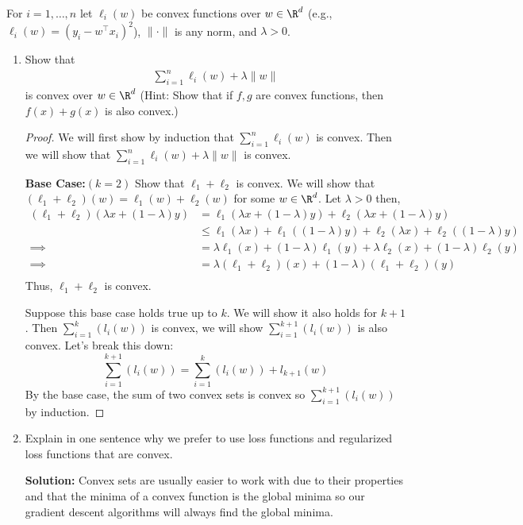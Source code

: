 \documentclass[shortlabels]{article}
\begin{document}
\begin{bprob}
    For $i=1,\dots,n$ let $\ell_i(w)$ be convex functions over $w \in \R^d$ (e.g., $\ell_i(w) = (y_i - w^\top x_i)^2$), $\| \cdot \|$ is any norm, and $\lambda >0$. 
    \begin{enumerate}
        \item {} Show that 
        \begin{align*}
            \sum_{i=1}^n \ell_i(w) + \lambda \| w \|
        \end{align*}
        is convex over $w\in \R^d$ (Hint: Show that if $f,g$ are convex functions, then $f(x) + g(x)$ is also convex.) 
        
        \begin{proof}
            We will first show by induction that $\sum_{i=1}^n \ell_i(w)$ is convex. Then we will show that $\sum_{i=1}^n \ell_i(w) + \lambda \| w \| $ is convex.

            \textbf{Base Case:}$(k=2)$ Show that $\ell_1 + \ell_2$ is convex. 
            We will show that $(\ell_1 + \ell_2)(w) = \ell_1(w) + \ell_2(w)$ for some $w \in \R^d$. Let $\lambda >0$ then,
            \begin{align*}
                (\ell_1 + \ell_2)(\lambda x + (1-\lambda)y) &= \ell_1(\lambda x + (1-\lambda)y) + \ell_2(\lambda x + (1-\lambda)y) \\
                &\leq \ell_1(\lambda x) + \ell_1((1-\lambda)y) + \ell_2(\lambda x) + \ell_2((1-\lambda)y) \\
                \implies &= \lambda \ell_1( x) + (1-\lambda) \ell_1(y) + \lambda  \ell_2(x) + (1-\lambda) \ell_2(y) \\
                \implies &=  \lambda (\ell_1 + \ell_2) (x) + (1-\lambda) (\ell_1 + \ell_2) (y) \\
            \end{align*}
            Thus, $\ell_1 + \ell_2$ is convex.

            Suppose this base case holds true up to $k$. We will show it also holds for $k+1$.
            Then $\sum_{i=1}^k (l_i(w))$ is convex, we will show $\sum_{i=1}^{k+1} (l_i(w))$ is also convex.
            Let's break this down:
            $$ \sum_{i=1}^{k+1} (l_i(w)) = \sum_{i=1}^k (l_i(w)) + l_{k+1}(w)$$
            By the base case, the sum of two convex sets is convex so $\sum_{i=1}^{k+1} (l_i(w))$ by induction.
        \end{proof}

        \newpage

        \item {} Explain in one sentence why we prefer to use loss functions and regularized loss functions that are convex.
    
        \textbf{Solution:} Convex sets are usually easier to work with due to their properties and that the minima of a convex function is the global minima so our gradient descent algorithms will always find the global minima. 
    \end{enumerate}

\end{bprob}
\end{document}
